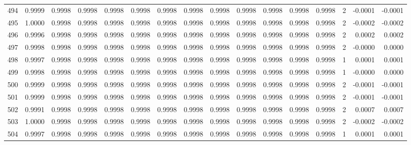 \begin{tabular}{lrrrrrrrrrrrrrrr}
494 &      0.9999 &  0.9998 &  0.9998 &  0.9998 &  0.9998 &  0.9998 &  0.9998 &  0.9998 &  0.9998 &  0.9998 &   0.9998 &     0.9998 &      2 &                   -0.0001 &                    -0.0001 \\
495 &      1.0000 &  0.9998 &  0.9998 &  0.9998 &  0.9998 &  0.9998 &  0.9998 &  0.9998 &  0.9998 &  0.9998 &   0.9998 &     0.9998 &      2 &                   -0.0002 &                    -0.0002 \\
496 &      0.9996 &  0.9998 &  0.9998 &  0.9998 &  0.9998 &  0.9998 &  0.9998 &  0.9998 &  0.9998 &  0.9998 &   0.9998 &     0.9998 &      2 &                    0.0002 &                     0.0002 \\
497 &      0.9998 &  0.9998 &  0.9998 &  0.9998 &  0.9998 &  0.9998 &  0.9998 &  0.9998 &  0.9998 &  0.9998 &   0.9998 &     0.9998 &      2 &                   -0.0000 &                     0.0000 \\
498 &      0.9997 &  0.9998 &  0.9998 &  0.9998 &  0.9998 &  0.9998 &  0.9998 &  0.9998 &  0.9998 &  0.9998 &   0.9998 &     0.9998 &      1 &                    0.0001 &                     0.0001 \\
499 &      0.9998 &  0.9998 &  0.9998 &  0.9998 &  0.9998 &  0.9998 &  0.9998 &  0.9998 &  0.9998 &  0.9998 &   0.9998 &     0.9998 &      1 &                   -0.0000 &                     0.0000 \\
500 &      0.9999 &  0.9998 &  0.9998 &  0.9998 &  0.9998 &  0.9998 &  0.9998 &  0.9998 &  0.9998 &  0.9998 &   0.9998 &     0.9998 &      2 &                   -0.0001 &                    -0.0001 \\
501 &      0.9999 &  0.9998 &  0.9998 &  0.9998 &  0.9998 &  0.9998 &  0.9998 &  0.9998 &  0.9998 &  0.9998 &   0.9998 &     0.9998 &      2 &                   -0.0001 &                    -0.0001 \\
502 &      0.9991 &  0.9998 &  0.9998 &  0.9998 &  0.9998 &  0.9998 &  0.9998 &  0.9998 &  0.9998 &  0.9998 &   0.9998 &     0.9998 &      2 &                    0.0007 &                     0.0007 \\
503 &      1.0000 &  0.9998 &  0.9998 &  0.9998 &  0.9998 &  0.9998 &  0.9998 &  0.9998 &  0.9998 &  0.9998 &   0.9998 &     0.9998 &      2 &                   -0.0002 &                    -0.0002 \\
504 &      0.9997 &  0.9998 &  0.9998 &  0.9998 &  0.9998 &  0.9998 &  0.9998 &  0.9998 &  0.9998 &  0.9998 &   0.9998 &     0.9998 &      1 &                    0.0001 &                     0.0001 \\

\end{tabular}

